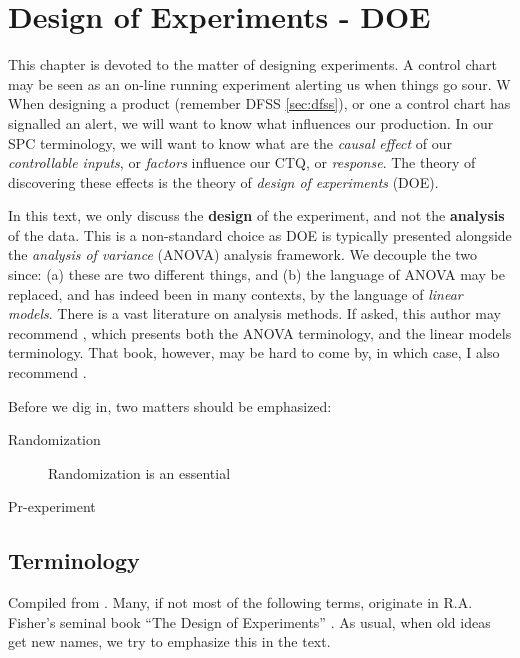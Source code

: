 \chapter[DOE]{Design of Experiments - DOE}

This chapter is devoted to the matter of designing experiments.
A control chart may be seen as an on-line running experiment alerting us when things go sour. W
When designing a product (remember DFSS \ref{sec:dfss}), or one a control chart has signalled an alert, we will want to know what influences our production.
In our SPC terminology, we will want to know what are the \emph{causal} \emph{effect} of our \emph{controllable inputs}, or \emph{factors} influence our CTQ, or \emph{response}. 
The theory of discovering these effects is the theory of \emph{design of experiments} (DOE).



\begin{remark}
In this text, we only discuss the \textbf{design} of the experiment, and not the \textbf{analysis} of the data.
This is a non-standard choice as DOE is typically presented alongside the \emph{analysis of variance} (ANOVA) analysis framework.
We decouple the two since: 
(a) these are two different things, and 
(b) the language of ANOVA may be replaced, and has indeed been in many contexts, by the language of \emph{linear models}.
There is a vast literature on analysis methods. 
If asked, this author may recommend \cite{hocking_analysis_1985}, which presents both the ANOVA terminology, and the linear models terminology.
That book, however, may be hard to come by, in which case, I also recommend \cite{mason_statistical_2003}.
\end{remark}


Before we dig in, two matters should be emphasized:
\begin{description}
\item [Randomization] Randomization is an essential 
\item [Pr-experiment]
\end{description}


\section{Terminology}
Compiled from \cite{mason_statistical_2003}.
Many, if not most of the following terms, originate in R.A. Fisher's seminal book ``The Design of Experiments'' \citep{fisher_design_1960}.
As usual, when old ideas get new names, we try to emphasize this in the text.

